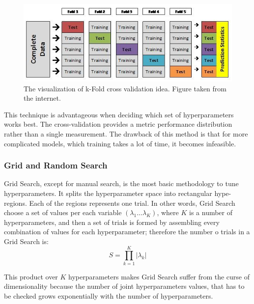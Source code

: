 \begin{figure}[h]
\centering
\includegraphics{figures/CV.PNG}
\caption{ The visualization of k-Fold cross validation idea. Figure taken from the internet.
\label{fig:CV}}
\end{figure}

This technique is advantageous when deciding which set of hyperparameters works best. The cross-validation provides a metric performance distribution rather than a single measurement. The drawback of this method is that for more complicated models, which training takes a lot of time, it becomes infeasible.

\subsubsection{Grid and Random Search}
\label{sec:GS and RS}
Grid Search, except for manual search, is the most basic methodology to tune hyperparameters. It splits the hyperparameter space into rectangular hype-regions. Each of the regions represents one trial. In other words, Grid Search choose a set of values per each variable $(\lambda_{1} \ldots \lambda_{K})$, where $K$ is a number of hyperparameters, and then a set of trials is formed by assembling every combination of values for each hyperparameter; therefore the number o trials in a Grid Search is:
\begin{equation}
    S=\prod^{K}_{k=1}|\lambda_{k}|  
\end{equation}

This product over $K$ hyperparameters makes Grid Search suffer from the curse of dimensionality because the number of joint hyperparameters values, that has to be checked grows exponentially with the number of hyperparameters. 

